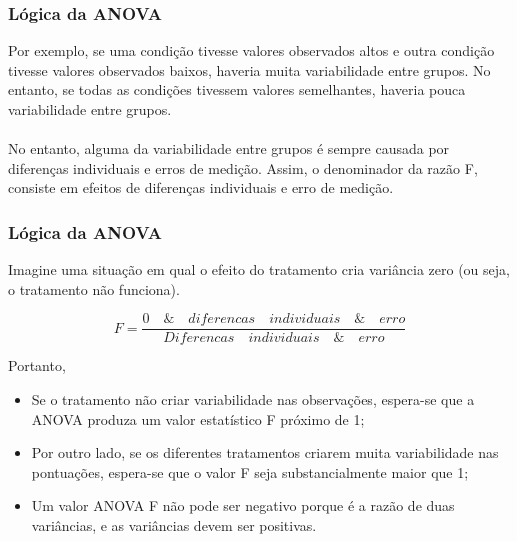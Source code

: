 \documentclass[11pt]{beamer}
\begin{document}
\begin{frame}
\frametitle{Lógica da ANOVA}
Por exemplo, se uma condição tivesse valores observados altos e outra condição tivesse valores observados baixos, haveria muita variabilidade entre grupos. No entanto, se todas as condições tivessem valores semelhantes, haveria pouca variabilidade entre grupos. \\~\\
No entanto, alguma da variabilidade entre grupos é sempre causada por diferenças individuais e erros de medição. Assim, o denominador da razão F, consiste em efeitos de diferenças individuais e erro de medição.
\end{frame}

\begin{frame}
\frametitle{Lógica da ANOVA}
Imagine uma situação em qual o efeito do tratamento cria variância zero (ou seja, o tratamento não funciona). 

\[F = \frac{0\quad \&\quad diferencas\quad individuais\quad \&\quad erro}{Diferencas\quad individuais\quad \&\quad erro}\]

Portanto, 
\begin{itemize}
\item Se o tratamento não criar variabilidade nas observações, espera-se que a ANOVA produza um valor estatístico F próximo de 1;
\item Por outro lado, se os diferentes tratamentos criarem muita variabilidade nas pontuações, espera-se que o valor F seja substancialmente maior que 1;
\item Um valor ANOVA F não pode ser negativo porque é a razão de duas variâncias, e as variâncias devem ser positivas. 
\end{itemize}
  
\end{frame}
\end{document}
